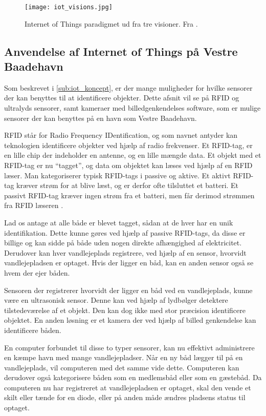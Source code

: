 \begin{figure}
  \centering
  \texttt{[image: iot\_visions.jpg]}
  \caption{Internet of Things paradigmet ud fra tre visioner. Fra \cite{iot_survey_2010}.}
  \label{fig:iot_visions}
\end{figure}

\subsection{Anvendelse af Internet of Things på Vestre Baadehavn}
\label{sub:iot_vestre_baadehavn}

Som beskrevet i \cref{sub:iot_koncept}, er der mange muligheder for hvilke sensorer der kan benyttes til at identificere objekter. Dette afsnit vil se på RFID og ultralyds sensorer, samt kameraer med billedgenkendelses software, som er mulige sensorer der kan benyttes på en havn som Vestre Baadehavn.

RFID står for Radio Frequency IDentification, og som navnet antyder kan teknologien identificere objekter ved hjælp af radio frekvenser. Et RFID-tag, er en lille chip der indeholder en antenne, og en lille mængde data. Et objekt med et RFID-tag er nu \enquote{tagget}, og data om objektet kan læses ved hjælp af en RFID læser. Man kategoriserer typisk RFID-tags i passive og aktive. Et aktivt RFID-tag kræver strøm for at blive læst, og er derfor ofte tilsluttet et batteri. Et passivt RFID-tag kræver ingen strøm fra et batteri, men får derimod strømmen fra RFID læseren \cite{want2006rfid}.

Lad os antage at alle både er blevet tagget, sådan at de hver har en unik identifikation. Dette kunne gøres ved hjælp af passive RFID-tags, da disse er billige og kan sidde på både uden nogen direkte afhængighed af elektricitet. Derudover kan hver vandlejeplads registrere, ved hjælp af en sensor, hvorvidt vandlejepladsen er optaget. Hvis der ligger en båd, kan en anden sensor også se hvem der ejer båden.

Sensoren der registrerer hvorvidt der ligger en båd ved en vandlejeplads, kunne være en ultrasonisk sensor. Denne kan ved hjælp af lydbølger detektere tilstedeværelse af et objekt. Den kan dog ikke med stor præcision identificere objektet. En anden løsning er et kamera der ved hjælp af billed genkendelse kan identificere båden.

En computer forbundet til disse to typer sensorer, kan nu effektivt administrere en kæmpe havn med mange vandlejepladser. Når en ny båd lægger til på en vandlejeplads, vil computeren med det samme vide dette. Computeren kan derudover også kategorisere båden som en medlemsbåd eller som en gæstebåd. Da computeren nu har registreret at vandlejepladsen er optaget, skal den vende et skilt eller tænde for en diode, eller på anden måde ændres pladsens status til optaget.


